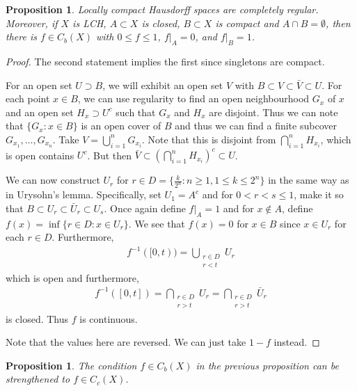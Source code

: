 \documentclass[11pt]{amsart}
\newtheorem{proposition}[theorem]{Proposition}
\theoremstyle{definition}
\numberwithin{equation}{section}
\begin{document}
\begin{proposition}
    Locally compact Hausdorff spaces are completely regular. Moreover, if $X$ is LCH, $A\subset X$ is closed, $B\subset X$ is compact and $A\cap B=\emptyset$, then there is $f\in C_b(X)$ with $0\le f\le 1$, $f|_A=0$, and $f|_B=1$.
\end{proposition}
\begin{proof}
    The second statement implies the first since singletons are compact.

    For an open set $U\supset B$, we will exhibit an open set $V$ with $B\subset V\subset \bar V\subset U$. For each point $x\in B$, we can use regularity to find an open neighbourhood $G_x$ of $x$ and an open set $H_x\supset U^c$ such that $G_x$ and $H_x$ are disjoint. Thus we can note that $\{G_x:x\in B\}$ is an open cover of $B$ and thus we can find a finite subcover $G_{x_1},\ldots,G_{x_n}$. Take $V=\bigcup_{i=1}^nG_{x_i}$. Note that this is disjoint from $\bigcap_{i=1}^n H_{x_i}$, which is open contains $U^c$. But then $\bar V\subset(\bigcap_{i=1}^nH_{x_i})^c\subset U$.

    We can now construct $U_r$ for $r\in D=\{\frac{k}{2^n}:n\ge 1,1\le k\le 2^n\}$ in the same way as in Urysohn's lemma. Specifically, set $U_1=A^c$ and for $0<r<s\le 1$, make it so that $B\subset U_r\subset \bar U_r\subset U_s$. Once again define $f|_A=1$ and for $x\not\in A$, define $f(x)=\inf\{r\in D:x\in U_r\}$. We see that $f(x)=0$ for $x\in B$ since $x\in U_r$ for each $r\in D$. Furthermore,
    \begin{align*}
        f^{-1}([0,t))=\bigcup_{\substack{r\in D\\r<t}}U_r
    \end{align*}
    which is open and furthermore,
    \begin{align*}
        f^{-1}([0,t])=\bigcap_{\substack{r\in D\\r>t}}U_r=\bigcap_{\substack{r\in D\\r>t}}\bar U_r
    \end{align*}
    is closed. Thus $f$ is continuous. 

    Note that the values here are reversed. We can just take $1-f$ instead.
\end{proof}
\begin{proposition}
    The condition $f\in C_b(X)$ in the previous proposition can be strengthened to $f\in C_c(X)$.
\end{proposition}
\end{document}
